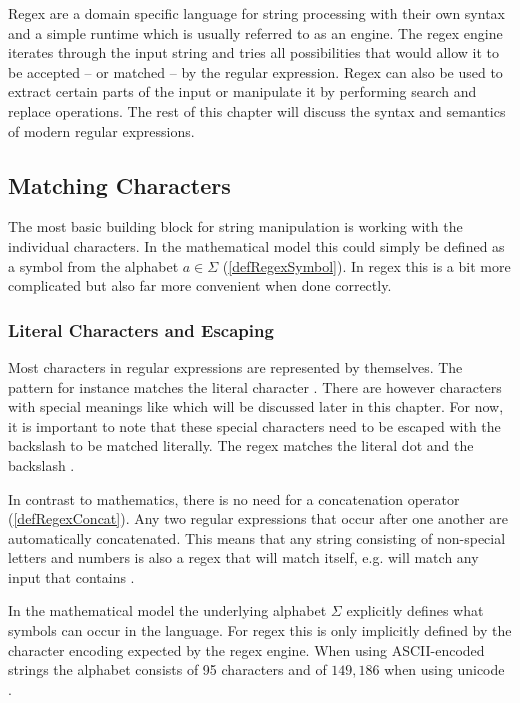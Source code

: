 Regex are a domain specific language for string processing with their own syntax and a simple runtime which is usually referred to as an engine. The regex engine iterates through the input string and tries all possibilities that would allow it to be accepted -- or matched -- by the regular expression. Regex can also be used to extract certain parts of the input or manipulate it by performing search and replace operations. The rest of this chapter will discuss the syntax and semantics of modern regular expressions.


\subsection{Matching Characters}

The most basic building block for string manipulation is working with the individual characters. In the mathematical model this could simply be defined as a symbol from the alphabet $a \in \Sigma$ (\ref{defRegexSymbol}). In regex this is a bit more complicated but also far more convenient when done correctly.

\subsubsection{Literal Characters and Escaping}

Most characters in regular expressions are represented by themselves. The pattern  for instance matches the literal character . There are however characters with special meanings like  which will be discussed later in this chapter. For now, it is important to note that these special characters need to be escaped with the backslash \pattern{\bs} to be matched literally. The regex  matches the literal dot  and \pattern{\bs\bs} the backslash \inp{\bs}.

In contrast to mathematics, there is no need for a concatenation operator (\ref{defRegexConcat}). Any two regular expressions that occur after one another are automatically concatenated. This means that any string consisting of non-special letters and numbers is also a regex that will match itself, e.g.  will match any input that contains .

In the mathematical model the underlying alphabet $\Sigma$ explicitly defines what symbols can occur in the language. For regex this is only implicitly defined by the character encoding expected by the regex engine. When using ASCII-encoded strings the alphabet consists of 95 characters \cite[p.~211~ff]{CodedCharacterSets} and of $149,186$ when using unicode \cite{UnicodeStandard15}. 


